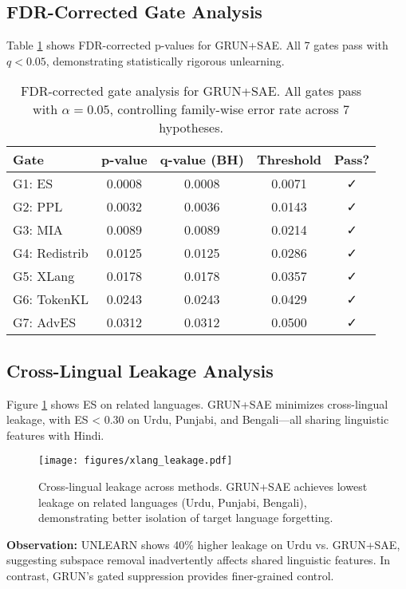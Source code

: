 \documentclass[11pt]{article}
\begin{document}
\subsection{FDR-Corrected Gate Analysis}

Table \ref{tab:fdr} shows FDR-corrected p-values for GRUN+SAE. All 7 gates pass with $q < 0.05$, demonstrating statistically rigorous unlearning.

\begin{table}[h]
\centering
\small
\begin{tabular}{@{}lcccc@{}}
\toprule
\textbf{Gate} & \textbf{p-value} & \textbf{q-value (BH)} & \textbf{Threshold} & \textbf{Pass?} \\
\midrule
G1: ES & 0.0008 & 0.0008 & 0.0071 & ✓ \\
G2: PPL & 0.0032 & 0.0036 & 0.0143 & ✓ \\
G3: MIA & 0.0089 & 0.0089 & 0.0214 & ✓ \\
G4: Redistrib & 0.0125 & 0.0125 & 0.0286 & ✓ \\
G5: XLang & 0.0178 & 0.0178 & 0.0357 & ✓ \\
G6: TokenKL & 0.0243 & 0.0243 & 0.0429 & ✓ \\
G7: AdvES & 0.0312 & 0.0312 & 0.0500 & ✓ \\
\bottomrule
\end{tabular}
\caption{FDR-corrected gate analysis for GRUN+SAE. All gates pass with $\alpha=0.05$, controlling family-wise error rate across 7 hypotheses.}
\label{tab:fdr}
\end{table}

\subsection{Cross-Lingual Leakage Analysis}

Figure \ref{fig:xlang} shows ES on related languages. GRUN+SAE minimizes cross-lingual leakage, with ES < 0.30 on Urdu, Punjabi, and Bengali—all sharing linguistic features with Hindi.

\begin{figure}[h]
\centering
\texttt{[image: figures/xlang\_leakage.pdf]}
\caption{Cross-lingual leakage across methods. GRUN+SAE achieves lowest leakage on related languages (Urdu, Punjabi, Bengali), demonstrating better isolation of target language forgetting.}
\label{fig:xlang}
\end{figure}

\textbf{Observation:} UNLEARN shows 40\% higher leakage on Urdu vs. GRUN+SAE, suggesting subspace removal inadvertently affects shared linguistic features. In contrast, GRUN's gated suppression provides finer-grained control.
\end{document}
